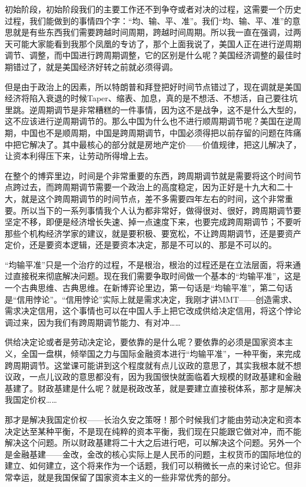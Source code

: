 \documentclass[UTF8, 12pt, a4paper]{ctexrep}
\begin{document}
初始阶段，初始阶段我们的主要工作还不到争夺或者对决的过程，这需要一个历史过程，我们能做到的事情四个字：“均、输、平、准”。我们“均、输、平、准”的意思就是有些东西我们需要跨越时间周期，跨越时间周期。所以我一直在强调，过两天可能大家能看到我那个凤凰的专访了，那个上面我说了，美国人正在进行逆周期调节、调整，而中国进行跨周期调整，它的区别是什么呢？美国经济调整的最佳时期错过了，就是美国经济好转之前就必须得调。

但是由于政治上的因素，所以特朗普和拜登把好时间节点错过了，现在调就是美国经济将陷入衰退的时候Taper、缩表、加息，真的是不想活、不想活，自己要往坑里跳。逆周期调节是非常糟糕的一件事情，因为这不是战争，这不是什么大型的，这不应该进行逆周期调节的。那么中国为什么也不进行顺周期调节呢？美国在逆周期，中国也不是顺周期，中国是跨周期调节，中国必须得把以前存留的问题在阵痛中把它解决了。其中最核心的部分就是房地产定价——价值规律，把这儿解决了，让资本利得压下来，让劳动所得增上去。

在整个的博弈里边，时间是个非常重要的东西，跨周期调节就是需要将这个时间节点跨过去，而跨周期调节需要一个政治上的高度稳定，因为正好是十九大和二十大，就是这个跨周期调节的时间节点，差不多需要四年左右的时间，这个非常重要。所以当下的一系列事情我个人认为都非常好，做得很对、很好，跨周期调节要坚定不移，即便是经济增长失速、掉一点速度下来，也要完成跨周期调节；不要听那些个机构经济学家的建议，就是要积极、要宽松，不让跨周期调节，还是要资产定价，还是要资本逻辑，还是要资本决定，那是不可以的、那是不可以的。

“均输平准”只是一个治疗的过程，不是根治，根治的过程还是在立法层面，将来通过直接税来彻底解决问题。现在我们需要争取时间做一个基本的“均输平准”，这是一个古典思维、古典思维。在新博弈论里边，第一句话是“均输平准”，第二句话是“信用悖论”。“信用悖论”实际上就是需求决定，我刚才讲MMT——创造需求、需求决定信用，这个事情也可以在中国人手上把它改成供给决定信用，将这个悖论调过来，因为我们有跨周期调节能力、有对冲……

供给决定论或者是劳动决定论，要依靠的是什么呢？要依靠的必须是国家资本主义，全国一盘棋，倾举国之力与国际金融资本进行“均输平准”，一种平衡，来完成跨周期调节。这堂课可能讲到这个程度就有点儿议政的意思了，其实我根本就不想议政，一点儿议政的意思都没有，因为我国很快就面临着大规模的财政基建和金融基建了。财政基建是什么呢？就是税政改革，就是要建立直接税体系，那才是解决我国定价权……

那才是解决我国定价权——长治久安之策呀！那个时候我们才能由劳动决定和资本决定达至某种平衡，不是现在纯粹的资本平衡，我们现在只能跟它做对冲，而不能解决这个问题。所以财政基建将二十大之后进行吧，可以解决这个问题。另外一个是金融基建——金改，金改的核心实际上是人民币的问题，主权货币的国际地位的建立、如何建立，这个将来作为一个话题，我们可以稍微长一点的来讨论它。但非常幸运，就是我国保留了国家资本主义的一些非常优秀的部分。
\end{document}
